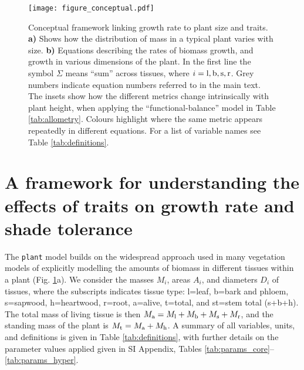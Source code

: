 \documentclass[9pt,twocolumn,twoside,lineno]{pnas-new}
\newcommand{\plant}{\texttt{plant}}
\begin{document}
\begin{figure}[!ht]
\centering
\texttt{[image: figure\_conceptual.pdf]}
\caption{Conceptual framework linking growth rate to plant size and traits.
\textbf{a)} Shows how the distribution of mass in a typical plant varies with size.
\textbf{b)} Equations describing the rates of biomass growth, and growth in various dimensions of the plant. In the first line the symbol $\Sigma$ means ``sum'' across tissues, where $i = {\rm l,b,s,r}$. Grey numbers indicate equation numbers referred to in the main text. The insets show how the different metrics change intrinsically with plant height, when applying the ``functional-balance'' model in Table \ref{tab:allometry}. Colours highlight where the same metric appears repeatedly in different equations. For a list of variable names see Table \ref{tab:definitions}.}
\label{fig:conceptual}
\end{figure}

\section*{A framework for understanding the effects of traits on growth rate and shade tolerance}

The {\plant} model builds on the widespread approach used in many vegetation models of explicitly modelling the amounts of biomass in different tissues within a plant \citep[e.g.][]{Givnish-1988, Makela-1997, Moorcroft-2001, Sitch-2008, Falster-2011, King-2011, DeKauwe-2014} (Fig. \ref{fig:conceptual}a). We consider the masses $M_i$, areas $A_i$, and diameters $D_i$ of tissues, where the subscripts indicates tissue type: l=leaf, b=bark and phloem, s=sapwood, h=heartwood, r=root, a=alive, t=total, and st=stem total (s+b+h). The total mass of living tissue is then $M_{\rm a}=M_{\rm l}+M_{\rm b}+M_{\rm s}+M_{\rm r}$, and the standing mass of the plant is $M_{\rm t}=M_{\rm a}+M_{\rm h}$. A summary of all variables, units, and definitions is given in Table \ref{tab:definitions}, with further details on the parameter values applied given in SI Appendix, Tables \ref{tab:params_core}--\ref{tab:params_hyper}.
\end{document}
